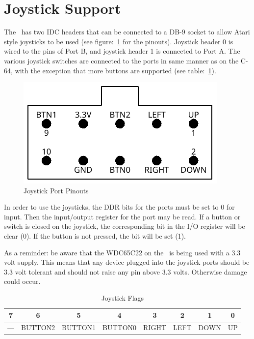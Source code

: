 \section*{Joystick Support}

The \jr\ has two IDC headers that can be connected to a DB-9 socket to allow Atari style joysticks to be used (see figure:~\ref{fig:joystick_ports} for the pinouts). Joystick header 0 is wired to the pins of Port B, and joystick header 1 is connected to Port A. The various joystick switches are connected to the ports in same manner as on the C-64, with the exception that more buttons are supported (see table:~\ref{tab:via_joystick}).

\begin{figure}[ht]
    \begin{center}
        \includegraphics{images/f256jr_joystick_pinout.pdf}
    \end{center}
    \caption{Joystick Port Pinouts}
    \label{fig:joystick_ports}
\end{figure}

In order to use the joysticks, the DDR bits for the ports must be set to 0 for input. Then the input/output register for the port may be read. If a button or switch is closed on the joystick, the corresponding bit in the I/O register will be clear (0). If the button is not pressed, the bit will be set (1).

As a reminder: be aware that the WDC65C22 on the \jr\ is being used with a 3.3 volt supply. This means that any device plugged into the joystick ports should be 3.3 volt tolerant and should not raise any pin above 3.3 volts. Otherwise damage could occur.

\begin{table}[ht]
    \begin{center}
        \begin{tabular}{|c|c|c|c|c|c|c|c|} \hline
            7 & 6 & 5 & 4 & 3 & 2 & 1 & 0 \\\hline\hline
            --- & BUTTON2 & BUTTON1 & BUTTON0 & RIGHT & LEFT & DOWN & UP \\ \hline
        \end{tabular}
    \end{center}
    \caption{Joystick Flags}
    \label{tab:via_joystick}
\end{table}

